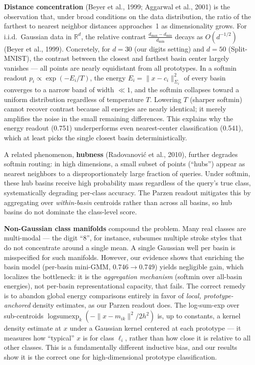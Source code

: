 \documentclass[11pt,a4paper]{article}
\DeclareMathOperator*{\logsumexp}{logsumexp}
\begin{document}
\textbf{Distance concentration} (Beyer et al., 1999; Aggarwal et al., 2001) is the observation that, under broad conditions on the data distribution, the ratio of the farthest to nearest neighbor distances approaches~1 as dimensionality grows. For i.i.d.~Gaussian data in $\mathbb{R}^d$, the relative contrast $\frac{d_{\max}-d_{\min}}{d_{\min}}$ decays as $O(d^{-1/2})$ (Beyer et al., 1999). Concretely, for $d=30$ (our digits setting) and $d=50$ (Split-MNIST), the contrast between the closest and farthest basin center largely vanishes --- all points are nearly equidistant from all prototypes. In a softmin readout $p_i \propto \exp(-E_i/T)$, the energy $E_i = \|x-c_i\|^2_{\Sigma_i}$ of every basin converges to a narrow band of width $\ll 1$, and the softmin collapses toward a uniform distribution regardless of temperature $T$. Lowering $T$ (sharper softmin) cannot recover contrast because all energies are nearly identical; it merely amplifies the noise in the small remaining differences. This explains why the energy readout (0.751) underperforms even nearest-center classification (0.541), which at least picks the single closest basin deterministically.

A related phenomenon, \textbf{hubness} (Radovanovi\'c et al., 2010), further degrades softmin routing: in high dimensions, a small subset of points (``hubs'') appear as nearest neighbors to a disproportionately large fraction of queries. Under softmin, these hub basins receive high probability mass regardless of the query's true class, systematically degrading per-class accuracy. The Parzen readout mitigates this by aggregating over \textit{within-basin} centroids rather than across all basins, so hub basins do not dominate the class-level score.

\textbf{Non-Gaussian class manifolds} compound the problem. Many real classes are multi-modal --- the digit ``8'', for instance, subsumes multiple stroke styles that do not concentrate around a single mean. A single Gaussian well per basin is misspecified for such manifolds. However, our evidence shows that enriching the basin model (per-basin mini-GMM, 0.746$\to$0.749) yields negligible gain, which localizes the bottleneck: it is the \textit{aggregation mechanism} (softmin over all-basin energies), not per-basin representational capacity, that fails. The correct remedy is to abandon global energy comparisons entirely in favor of \textit{local, prototype-anchored} density estimates, as our Parzen readout does. The log-sum-exp over sub-centroids $\logsumexp_k(-\|x-m_{ik}\|^2/2h^2)$ is, up to constants, a kernel density estimate at $x$ under a Gaussian kernel centered at each prototype --- it measures how ``typical'' $x$ is for class $\ell_i$, rather than how close it is relative to all other classes. This is a fundamentally different inductive bias, and our results show it is the correct one for high-dimensional prototype classification.
\end{document}
